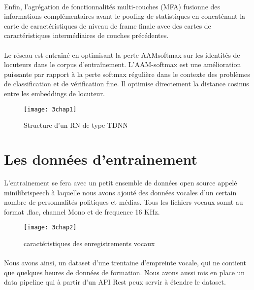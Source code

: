 \paragraph{}Enfin, l'agrégation de fonctionnalités multi-couches (MFA) fusionne des informations complémentaires avant le pooling de statistiques en concaténant la carte de caractéristiques de niveau de frame finale avec des cartes de caractéristiques intermédiaires de couches précédentes.
\paragraph{}Le réseau est entraîné en optimisant la perte AAMsoftmax sur les identités de locuteurs dans le corpus d'entraînement. L'AAM-softmax est une amélioration puissante par rapport à la perte softmax régulière dans le contexte des problèmes de classification et de vérification fine. Il optimise directement la distance cosinus entre les embeddings de locuteur.


\begin{figure}[h]
    \centering
    \texttt{[image: 3chap1]}
    \caption{Structure d'un RN de type TDNN}
    \label{fig:3chap1}
\end{figure}
\paragraph{}


\section{Les données d'entrainement}
L’entrainement se fera avec un petit ensemble de données open source appelé minilibrispeech à laquelle nous avons ajouté des données vocales d’un certain nombre de personnalités politiques et médias. Tous les fichiers vocaux sonnt au format .flac, channel Mono et de frequence 16 KHz.

\begin{figure}[h]
    \centering
    \texttt{[image: 3chap2]}
    \caption{caractéristiques des enregistrements vocaux}
    \label{fig:3chap2}
\end{figure}
\paragraph{}Nous avons ainsi, un dataset d’une trentaine d’empreinte vocale, qui ne contient que quelques heures de données de formation. Nous avons aussi mis en place un data pipeline qui à partir d’un API Rest peux servir à étendre le dataset. 


